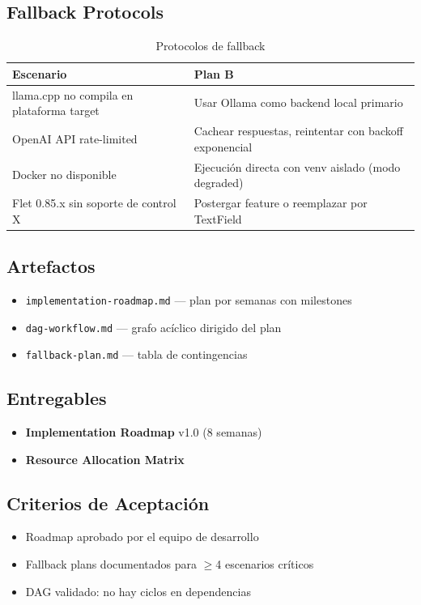 \documentclass[12pt,a4paper]{article}
\begin{document}
\subsection*{Fallback Protocols}
\begin{table}[h]
\centering
\begin{tabular}{p{} p{}}
\toprule
\textbf{Escenario} & \textbf{Plan B} \\
\midrule
llama.cpp no compila en plataforma target & Usar Ollama como backend local primario \\
OpenAI API rate-limited  & Cachear respuestas, reintentar con backoff exponencial \\
Docker no disponible    & Ejecución directa con venv aislado (modo degraded) \\
Flet 0.85.x sin soporte de control X & Postergar feature o reemplazar por TextField \\
\bottomrule
\end{tabular}
\caption{Protocolos de fallback}
\end{table}

\subsection*{Artefactos}
\begin{itemize}
  \item \texttt{implementation-roadmap.md} --- plan por semanas con milestones
  \item \texttt{dag-workflow.md} --- grafo acíclico dirigido del plan
  \item \texttt{fallback-plan.md} --- tabla de contingencias
\end{itemize}

\subsection*{Entregables}
\begin{itemize}
  \item \textbf{Implementation Roadmap} v1.0 (8 semanas)
  \item \textbf{Resource Allocation Matrix}
\end{itemize}

\subsection*{Criterios de Aceptación}
\begin{itemize}
  \item[{${[\;]}$}] Roadmap aprobado por el equipo de desarrollo
  \item[{${[\;]}$}] Fallback plans documentados para $\geq$4 escenarios críticos
  \item[{${[\;]}$}] DAG validado: no hay ciclos en dependencias
\end{itemize}
\end{document}
